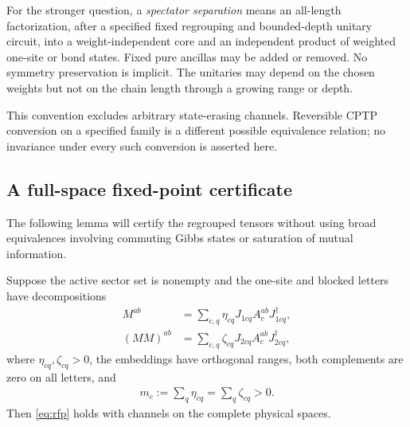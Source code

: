 For the stronger question, a \emph{spectator separation} means an
all-length factorization, after a specified fixed regrouping and
bounded-depth unitary circuit, into a weight-independent core and an
independent product of weighted one-site or bond states. Fixed pure
ancillas may be added or removed. No symmetry preservation is
implicit. The unitaries may depend on the chosen weights but not
on the chain length through a growing range or depth.

This convention excludes arbitrary state-erasing channels. Reversible
CPTP conversion on a specified family is a different possible
equivalence relation; no invariance under every such conversion is
asserted here.

\subsection{A full-space fixed-point certificate}

The following lemma will certify the regrouped tensors without using
broad equivalences involving commuting Gibbs states or saturation of
mutual information.

\begin{lemma}
	\label{lem:channels}
	Suppose the active sector set is nonempty and the one-site and blocked
	letters have decompositions
	\begin{align}
		M^{ab}
		 & =\sum_{c,q}\eta_{cq}J_{1cq}A_c^{ab}J_{1cq}^\dagger,  \\
		(MM)^{ab}
		 & =\sum_{c,q}\zeta_{cq}J_{2cq}A_c^{ab}J_{2cq}^\dagger,
	\end{align}
	where $\eta_{cq},\zeta_{cq}>0$, the embeddings have orthogonal
	ranges, both complements are zero on all letters, and
	\begin{align}
		m_c:=\sum_q\eta_{cq}=\sum_q\zeta_{cq}>0.
		\label{eq:equal-masses}
	\end{align}
	Then \cref{eq:rfp} holds with channels on the complete physical spaces.
\end{lemma}

